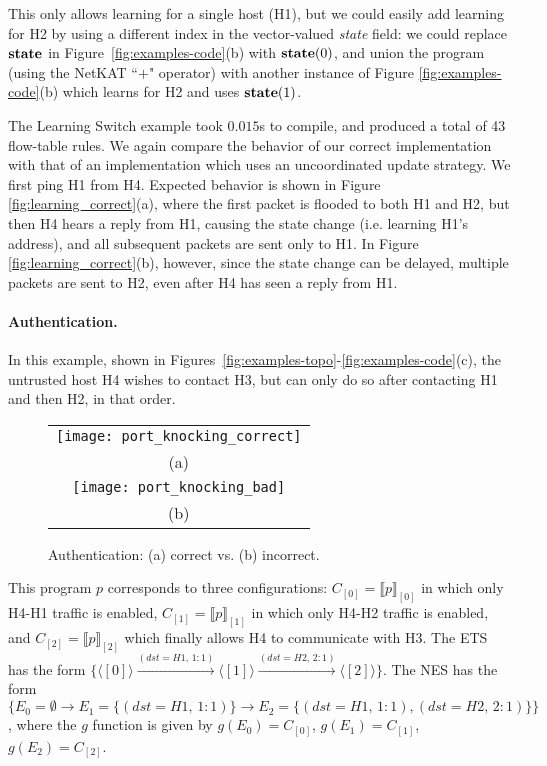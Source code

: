 \documentclass[pldi-cameraready]{sigplanconf}
\newcommand{\kw}[1]{\text{\tt\bf #1}}
\begin{document}
This only allows learning for a single host (H1), but
we could easily add learning for H2 by using a different index in the vector-valued {\em state} field:
we could replace $\kw{state}$ in Figure~\ref{fig:examples-code}(b) with $\kw{state}(0)$,
and union the program (using the NetKAT ``$+$" operator) with another instance of
Figure \ref{fig:examples-code}(b) which learns for H2 and uses $\kw{state}(1)$.

The Learning Switch example took $0.015$s to compile, and produced a total of 43 flow-table rules. We again compare the behavior of our correct implementation with that of an
implementation which uses an uncoordinated update strategy.
We first ping H1 from H4. Expected behavior is shown in Figure \ref{fig:learning_correct}(a), 
where the first packet is flooded to both H1 and H2, but then H4 hears a
reply from H1, causing the state change (i.e. learning H1's address),
and all subsequent packets are sent only to H1.
In Figure \ref{fig:learning_correct}(b), however, since the state change can be
delayed, multiple packets are sent to H2, even after H4 has seen a reply from H1.




\paragraph{Authentication.} In this example, shown in Figures~\ref{fig:examples-topo}-\ref{fig:examples-code}(c), the untrusted host H4 wishes to contact H3,
but can only do so after contacting H1 and then H2, in
that order.

\begin{figure}
\centering
\bgroup
\def\arraystretch{0.5}
\begin{tabular}{c}
\texttt{[image: port\_knocking\_correct]} \\
{\scriptsize (a)} \\
\texttt{[image: port\_knocking\_bad]} \\
{\scriptsize (b)}
\end{tabular}
\egroup
\caption{Authentication: (a) correct vs. (b) incorrect.}
\label{fig:knocking_correct}
\end{figure}

This program $p$ corresponds to three configurations:
$C_{[0]} = \llbracket{p}\rrbracket_{[0]}$ in which only H4-H1 traffic is enabled,
$C_{[1]} = \llbracket{p}\rrbracket_{[1]}$ in which only H4-H2 traffic is enabled,
and $C_{[2]} = \llbracket{p}\rrbracket_{[2]}$ which finally allows H4 to communicate with H3.
The ETS has the form $\{\langle [0] \rangle \xrightarrow{(dst{=}H1,\,{1{:}1})} \langle [1] \rangle \xrightarrow{(dst{=}H2,\,{2{:}1})} \langle [2] \rangle\}$.
The NES has the form $\{E_0{=}\emptyset \rightarrow E_1{=}\{(dst{=}H1,\,{1{:}1})\} \rightarrow E_2{=}\{(dst{=}H1,\,{1{:}1}),(dst{=}H2,\,\allowbreak{2{:}1})\}\}$,
where the $g$ function is given by $g(E_0)=C_{[0]}$, $g(E_1)=C_{[1]}$, $g(E_2)=C_{[2]}$.
\end{document}
